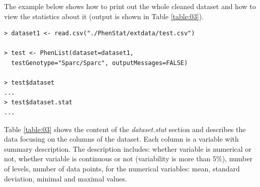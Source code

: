 \documentclass[12pt,a4paper]{article}
\begin{document}
The example below shows how to print out the whole cleaned dataset and how to view the statistics about it (output is shown in Table \ref{table:03}). 
\begingroup
    \fontsize{8pt}{12pt}\selectfont
\begin{verbatim}
> dataset1 <- read.csv("./PhenStat/extdata/test.csv")

> test <- PhenList(dataset=dataset1,
  testGenotype="Sparc/Sparc", outputMessages=FALSE)

> test$dataset
...
> test$dataset.stat
...
\end{verbatim}
\endgroup
Table \ref{table:03} shows the content of the \textit{dataset.stat} section and describes the data focusing on the columns of the dataset. Each column is a variable with summary description. 
The description includes: whether variable is numerical or not, whether variable is continuous or not (variability is more than 5\%), number of levels, number of data points, for the numerical variables: mean, standard deviation, minimal and maximal values.
\end{document}
